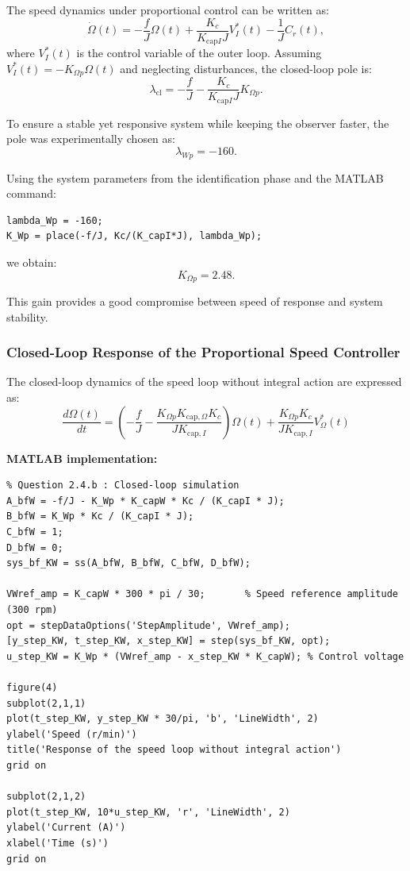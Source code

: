 \documentclass{rapportCS}
\begin{document}
The speed dynamics under proportional control can be written as:
\[
\dot{\Omega}(t) = -\frac{f}{J}\Omega(t) + \frac{K_c}{K_{\text{cap}I}J}V_I^\ast(t) - \frac{1}{J}C_r(t),
\]
where $V_I^\ast(t)$ is the control variable of the outer loop.  
Assuming $V_I^\ast(t) = -K_{\Omega p}\Omega(t)$ and neglecting disturbances, the closed-loop pole is:
\[
\lambda_{\text{cl}} = -\frac{f}{J} - \frac{K_c}{K_{\text{cap}I}J}K_{\Omega p}.
\]

To ensure a stable yet responsive system while keeping the observer faster, the pole was experimentally chosen as:
\[
\lambda_{Wp} = -160.
\]

Using the system parameters from the identification phase and the MATLAB command:
\begin{verbatim}
lambda_Wp = -160;
K_Wp = place(-f/J, Kc/(K_capI*J), lambda_Wp);
\end{verbatim}

we obtain:
\[
\boxed{K_{\Omega p} = 2.48.}
\]

This gain provides a good compromise between speed of response and system stability.

\subsubsection{Closed-Loop Response of the Proportional Speed Controller}

The closed-loop dynamics of the speed loop without integral action are expressed as:
\begin{equation*}
\frac{d\Omega(t)}{dt} =
\left(-\frac{f}{J} - \frac{K_{\Omega p}K_{\mathrm{cap},\Omega}K_c}{J K_{\mathrm{cap},I}}\right)\Omega(t)
+ \frac{K_{\Omega p} K_c}{J K_{\mathrm{cap},I}} V_{\Omega}^*(t)
\end{equation*}

\noindent\textbf{MATLAB implementation:}
\begin{verbatim}
% Question 2.4.b : Closed-loop simulation
A_bfW = -f/J - K_Wp * K_capW * Kc / (K_capI * J);
B_bfW = K_Wp * Kc / (K_capI * J);
C_bfW = 1;
D_bfW = 0;
sys_bf_KW = ss(A_bfW, B_bfW, C_bfW, D_bfW);

VWref_amp = K_capW * 300 * pi / 30;       % Speed reference amplitude (300 rpm)
opt = stepDataOptions('StepAmplitude', VWref_amp);
[y_step_KW, t_step_KW, x_step_KW] = step(sys_bf_KW, opt);
u_step_KW = K_Wp * (VWref_amp - x_step_KW * K_capW); % Control voltage

figure(4)
subplot(2,1,1)
plot(t_step_KW, y_step_KW * 30/pi, 'b', 'LineWidth', 2)
ylabel('Speed (r/min)')
title('Response of the speed loop without integral action')
grid on

subplot(2,1,2)
plot(t_step_KW, 10*u_step_KW, 'r', 'LineWidth', 2)
ylabel('Current (A)')
xlabel('Time (s)')
grid on
\end{verbatim}
\end{document}
